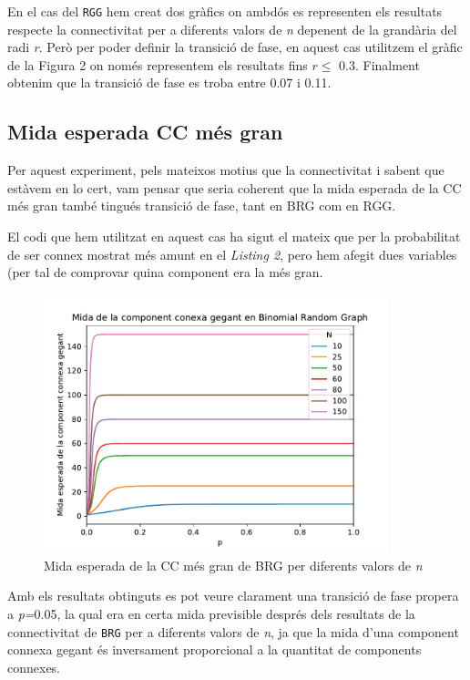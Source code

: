 En el cas del \texttt{RGG} hem creat dos gràfics on ambdós es representen els resultats respecte la connectivitat per a diferents valors de \textit{n} depenent de la grandària del radi \textit{r}. Però per poder definir la transició de fase, en aquest cas utilitzem el gràfic de la Figura 2 on només representem els resultats fins $r\leq$ 0.3. Finalment obtenim que la transició de fase es troba entre 0.07 i 0.11.


\subsection{Mida esperada CC més gran}
Per aquest experiment, pels mateixos motius que la connectivitat i sabent que estàvem en lo cert, vam pensar que seria coherent que la mida esperada de la CC més gran també tingués transició de fase, tant en BRG com en RGG.

El codi que hem utilitzat en aquest cas ha sigut el mateix que per la probabilitat de ser connex mostrat més amunt en el \textit{Listing 2}, pero hem afegit dues variables (per tal de comprovar quina component era la més gran.

\begin{figure}[H]
    \centering
    \includegraphics[width=10cm]{plots/BRG_midaCompConMax.pdf}
    \caption{Mida esperada de la CC més gran de BRG per diferents valors de \textit{n}}
    \label{fig:connect_04}
\end{figure}

Amb els resultats obtinguts es pot veure clarament una transició de fase propera a \textit{p=}0.05, la qual era en certa mida previsible després dels resultats de la connectivitat de \texttt{BRG} per a diferents valors de \textit{n}, ja que la mida d'una component connexa gegant és inversament proporcional a la quantitat de components connexes. %


